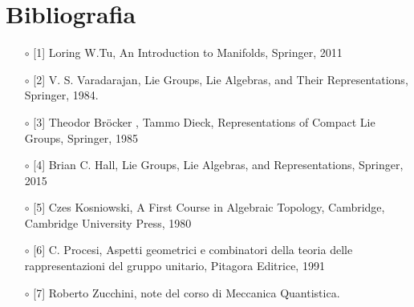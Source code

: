 \documentclass[12pt,a4paper]{report}
\theoremstyle{definition}
\theoremstyle{Theorem}
\theoremstyle{definition}
\theoremstyle{definition}
\theoremstyle{definition}
\begin{document}
\chapter*{Bibliografia}
\begin{itemize}
	\item[$\circ$] [1] Loring W.Tu, An Introduction to Manifolds, Springer, 2011
	\item[$\circ$] [2] V. S. Varadarajan, Lie Groups, Lie Algebras, and Their Representations, Springer,
	1984.
	\item[$\circ$] [3] Theodor Bröcker , Tammo Dieck, Representations of Compact Lie Groups, Springer, 1985
	\item[$\circ$] [4] Brian C. Hall, Lie Groups, Lie Algebras, and Representations, Springer, 2015
	\item [$\circ$] [5] Czes Kosniowski, A First Course in Algebraic Topology, Cambridge, Cambridge University Press, 1980
	\item [$\circ$] [6] C. Procesi, Aspetti geometrici e combinatori della teoria delle rappresentazioni del gruppo unitario, Pitagora Editrice, 1991
	\item [$\circ$] [7] Roberto Zucchini, note del corso di Meccanica Quantistica.
\end{itemize}
\end{document}
